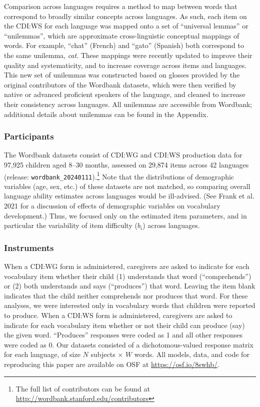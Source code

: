 \documentclass[
  letterpaper,
  DIV=11,
  numbers=noendperiod]{scrartcl}
\begin{document}
Comparison across languages requires a method to map between words that
correspond to broadly similar concepts across languages. As such, each
item on the CDI:WS for each language was mapped onto a set of
``universal lemmas'' or ``unilemmas'', which are approximate
cross-linguistic conceptual mappings of words. For example, ``chat''
(French) and ``gato'' (Spanish) both correspond to the same unilemma,
\emph{cat}. These mappings were recently updated to improve their
quality and systematicity, and to increase coverage across items and
languages. This new set of unilemmas was constructed based on glosses
provided by the original contributors of the Wordbank datasets, which
were then verified by native or advanced proficient speakers of the
language, and cleaned to increase their consistency across languages.
All unilemmas are accessible from Wordbank; additional details about
unilemmas can be found in the Appendix.

\subsubsection{Participants}\label{participants}

The Wordbank datasets consist of CDI:WG and CDI:WS production data for
97,925 children aged 8--30 months, assessed on 29,874 items across 42
languages (release: \texttt{wordbank\_20240111}).\footnote{The full list
  of contributors can be found at
  \url{http://wordbank.stanford.edu/contributors}} Note that the
distributions of demographic variables (age, sex, etc.) of these
datasets are not matched, so comparing overall language ability
estimates across languages would be ill-advised. (See Frank et al. 2021
for a discussion of effects of demographic variables on vocabulary
development.) Thus, we focused only on the estimated item parameters,
and in particular the variability of item difficulty (\(b_i\)) across
languages.

\subsubsection{Instruments}\label{instruments}

When a CDI:WG form is administered, caregivers are asked to indicate for
each vocabulary item whether their child (1) understands that word
(``comprehends'') or (2) both understands and says (``produces'') that
word. Leaving the item blank indicates that the child neither
comprehends nor produces that word. For these analyses, we were
interested only in vocabulary words that children were reported to
produce. When a CDI:WS form is administered, caregivers are asked to
indicate for each vocabulary item whether or not their child can produce
(say) the given word. ``Produces'' responses were coded as 1 and all
other responses were coded as 0. Our datasets consisted of a
dichotomous-valued response matrix for each language, of size \(N\)
subjects \(\times\) \(W\) words. All models, data, and code for
reproducing this paper are available on OSF at
\href{https://osf.io/8swhb/?view_only=6f6ab9818f2a4bb288e05ca9e12f540c}{https://osf.io/8swhb/}.
\end{document}
